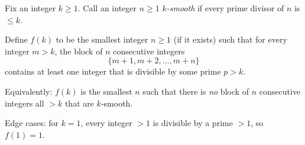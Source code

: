 Fix an integer $k\ge 1$. Call an integer $n\ge 1$ \emph{$k$-smooth} if every prime divisor of $n$ is $\le k$.

Define $f(k)$ to be the smallest integer $n\ge 1$ (if it exists) such that for every integer $m>k$, the block of $n$ consecutive integers
\[
\{m+1,m+2,\dots,m+n\}
\]
contains at least one integer that is divisible by some prime $p>k$.

Equivalently: $f(k)$ is the smallest $n$ such that there is \emph{no} block of $n$ consecutive integers all $>k$ that are $k$-smooth.

Edge cases: for $k=1$, every integer $>1$ is divisible by a prime $>1$, so $f(1)=1$.
